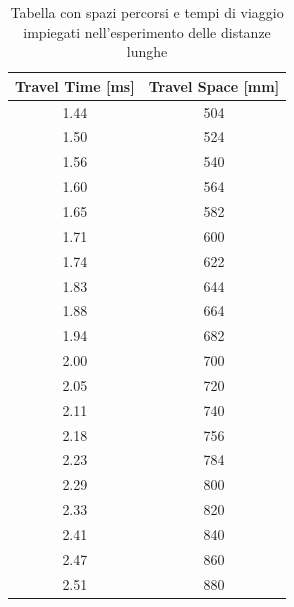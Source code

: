 \documentclass[10pt, a4paper, italian]{article}
\begin{document}
\begin{table}[htbp]
\centering
	\begin{tabular}{cc}
	\toprule
	Travel Time [ms] & Travel Space [mm] \\
	\midrule
	\midrule
	1.44                              & 504                                  \\
	1.50                              & 524                                  \\
	1.56                              & 540                                  \\
	1.60                              & 564                                  \\
	1.65                              & 582                                  \\
	1.71                              & 600                                  \\
	1.74                              & 622                                  \\
	1.83                              & 644                                  \\
	1.88                              & 664                                  \\
	1.94                              & 682                                  \\
	2.00                              & 700                                  \\
	2.05                              & 720                                  \\
	2.11                              & 740                                  \\
	2.18                              & 756                                  \\
	2.23                              & 784                                  \\
	2.29                              & 800                                  \\
	2.33                              & 820                                  \\
	2.41                              & 840                                  \\
	2.47                              & 860                                  \\
	2.51                              & 880                                  \\
	\bottomrule
	\end{tabular}
	\caption{Tabella con spazi percorsi e tempi di viaggio impiegati nell'esperimento delle distanze lunghe}
\end{table}
\end{document}
